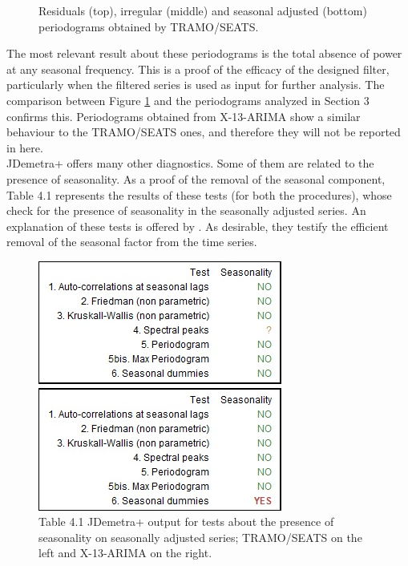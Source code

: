 \documentclass[english,blauw]{cbsdiscussionpaper}
\begin{document}
\begin{figure}[H]
\caption{Residuals (top), irregular (middle) and seasonal adjusted (bottom) periodograms obtained by TRAMO/SEATS.}
\label{fig:TSperr}
\end{figure}
The most relevant result about these periodograms is the total absence of power at any seasonal frequency. This is a proof of the efficacy of the designed filter, particularly when the filtered series is used as input for further analysis. The comparison between Figure \ref{fig:TSperr} and the periodograms analyzed in Section 3 confirms this. Periodograms obtained from X-13-ARIMA show a similar behaviour to the TRAMO/SEATS ones, and therefore they will not be reported in here.\\JDemetra+ offers many other diagnostics. Some of them are related to the presence of seasonality. As a proof of the removal of the seasonal component, Table 4.1 represents the results of these tests (for both the procedures), whose check for the presence of seasonality in the seasonally adjusted series. An explanation of these tests is offered by \citep{gru2015}. As desirable, they testify the efficient removal of the seasonal factor from the time series.
\begin{figure}[h]
\label{fig:test}
  \begin{minipage}[b]{0.5\textwidth}
    \includegraphics[width=\linewidth]{../images/capitolo4/testTS.jpg}
  \end{minipage}
  \hfill
  \begin{minipage}[b]{0.5\textwidth}
    \includegraphics[width=\linewidth]{../images/capitolo4/testX13.jpg}
  \end{minipage} 
  \caption*{Table 4.1 \quad JDemetra+ output for tests about the presence of seasonality on seasonally adjusted series; TRAMO/SEATS on the left and X-13-ARIMA on the right.}
\end{figure}
\end{document}

